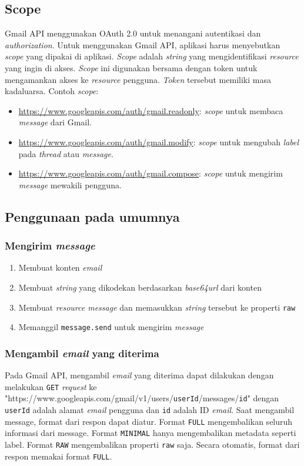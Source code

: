 \subsection{Scope}
Gmail API menggunakan OAuth 2.0 untuk menangani autentikasi dan \textit{authorization}. Untuk menggunakan Gmail API, aplikasi harus menyebutkan \textit{scope} yang dipakai di aplikasi. \textit{Scope} adalah \textit{string} yang mengidentifikasi \textit{resource} yang ingin di akses. \textit{Scope} ini digunakan bersama dengan token untuk mengamankan akses ke \textit{resource} pengguna. \textit{Token} tersebut memiliki masa kadaluarsa. Contoh \textit{scope}:
\begin{itemize}
\item \url{https://www.googleapis.com/auth/gmail.readonly}: \textit{scope} untuk membaca \textit{message} dari Gmail.
\item \url{https://www.googleapis.com/auth/gmail.modify}: \textit{scope} untuk mengubah \textit{label} pada \textit{thread} atau \textit{message}.
\item \url{https://www.googleapis.com/auth/gmail.compose}: \textit{scope} untuk mengirim \textit{message} mewakili pengguna.
\end{itemize}

\subsection{Penggunaan pada umumnya}
\subsubsection{Mengirim \textit{message}}
\begin{enumerate}
\item Membuat konten \textit{email}
\item Membuat \textit{string} yang dikodekan berdasarkan \textit{base64url} dari konten
\item Membuat \textit{resource message} dan memasukkan \textit{string} tersebut ke properti \texttt{raw}
\item Memanggil \texttt{message.send} untuk mengirim \textit{message}
\end{enumerate}

\subsubsection{Mengambil \textit{email} yang diterima}
Pada Gmail API, mengambil \textit{email} yang diterima dapat dilakukan dengan melakukan \texttt{GET} \textit{request} ke "https://www.googleapis.com/gmail/v1/users/\texttt{userId}/messages/\texttt{id}" dengan \texttt{userId} adalah alamat \textit{email} pengguna dan \texttt{id} adalah ID \textit{email}. Saat mengambil message, format dari respon dapat diatur. Format \texttt{FULL} mengembalikan seluruh informasi dari message. Format \texttt{MINIMAL} hanya mengembalikan metadata seperti label. Format \texttt{RAW} mengembalikan properti \texttt{raw} saja. Secara otomatis, format dari respon memakai format \texttt{FULL}.

